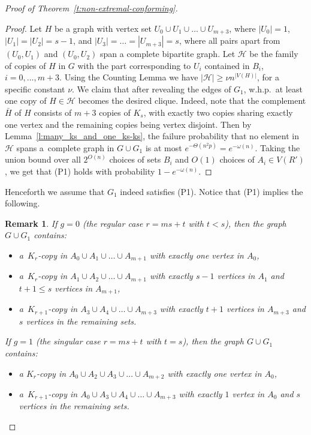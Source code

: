 \documentclass[reqno, 12pt]{amsart}
\numberwithin{equation}{section}
\numberwithin{figure}{section}
\theoremstyle{plain}
\newtheorem{remark}[thm]{Remark}
\theoremstyle{definition}
\begin{document}
\begin{proof}[Proof of Theorem~\ref{t:non-extremal-conforming}]
      
    \begin{proof}
        Let $H$ be a graph with vertex set $U_0\cup U_1 \cup\dots\cup U_{m+3}$, where $|U_0|=1$, $|U_1|=|U_2|=s-1$, and $|U_3|=\dots=|U_{m+3}|=s$, where all pairs apart from $(U_0,U_1)$ and $(U_0, U_2)$ span a complete bipartite graph.
        Let $\mathcal{H}$ be the family of copies of $H$ in $G$ with the part corresponding to $U_i$ contained in $B_i$, $i=0,\dots,m+3$. Using the Counting Lemma we have $|\mathcal{H}|\geq \nu n^{|V(H)|}$, for a specific constant $\nu$. 
        We claim that after revealing the edges of $G_1$, w.h.p.~at least one copy of $H\in \mathcal{H}$ becomes the desired clique. Indeed, note that the complement $\bar{H}$ of $H$ consists of $m+3$ copies of $K_s$, with exactly two copies sharing exactly one vertex and the remaining copies being vertex disjoint. Then by Lemma~\ref{l:many_ks_and_one_ks-ks}, the failure probability that no element in $\mathcal{H}$ spans a~complete graph in $G\cup G_1$ is at most $e^{-\Theta(n^2p)}=e^{-\omega(n)}$. Taking the union bound over all $2^{O(n)}$ choices of sets $B_i$ and $O(1)$ choices of $A_i\in V(R')$, we get that (P1) holds with probability $1-e^{-\omega(n)}$.
    \end{proof}

    Henceforth we assume that $G_1$ indeed satisfies (P1). Notice that (P1) implies the following.
    
    \begin{remark}\label{rem:(P1)}
    If $g=0$ 
    (the regular case $r = ms+t$ with $t < s$), 
    then the graph $G \cup G_1$ contains:
    \begin{itemize}
        \item a~$K_{r}$-copy in $A_0 \cup A_1 \cup \dots \cup A_{m+1}$ with exactly one vertex in $A_0$,
        \item a~$K_{r}$-copy in $A_1 \cup A_2 \cup \dots \cup A_{m+1}$ with exactly $s-1$ vertices in $A_1$ and $t+1\leq s$ vertices in $A_{m+1}$,
        \item a~$K_{r+1}$-copy in $A_3 \cup A_4 \cup \dots \cup A_{m+3}$ with exactly $t+1$ vertices in $A_{m+3}$ and $s$ vertices in the remaining sets.
    \end{itemize} 
        
    If $g=1$ 
    (the singular case $r = ms+t$ with $t = s$), 
    then the graph $G \cup G_1$ contains:
    \begin{itemize}
        \item a $K_{r}$-copy in $A_0 \cup A_2 \cup A_3 \cup \dots \cup  A_{m+2}$ with exactly one vertex in $A_0$,
        \item a~$K_{r+1}$-copy in $A_0\cup A_3 \cup A_4 \cup \dots \cup A_{m+3}$ with exactly $1$ vertex in $A_0$ and $s$ vertices in the remaining sets.
    \end{itemize} 
    \end{remark}
    

\end{proof}
\end{document}
